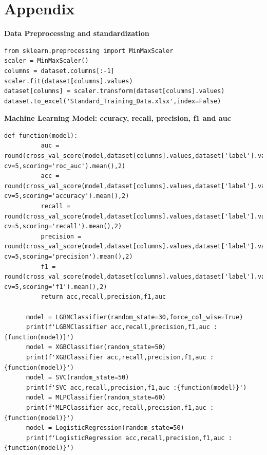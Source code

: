 \documentclass[12pt]{article}
\begin{document}
\section{Appendix}

\textbf{Data Preprocessing and standardization}
\begin{lstlisting}[caption={Data Preprocessing and standardization}, label=python-example]
from sklearn.preprocessing import MinMaxScaler
scaler = MinMaxScaler()
columns = dataset.columns[:-1]
scaler.fit(dataset[columns].values)
dataset[columns] = scaler.transform(dataset[columns].values)
dataset.to_excel('Standard_Training_Data.xlsx',index=False)
\end{lstlisting}

\textbf{Machine Learning Model: ccuracy, recall, precision, f1 and auc}
\begin{lstlisting}[caption={Machine Learning Model: ccuracy, recall, precision, f1 and auc}, label=python-example]
      def function(model):
          auc = round(cross_val_score(model,dataset[columns].values,dataset['label'].values, cv=5,scoring='roc_auc').mean(),2)
          acc = round(cross_val_score(model,dataset[columns].values,dataset['label'].values, cv=5,scoring='accuracy').mean(),2)
          recall = round(cross_val_score(model,dataset[columns].values,dataset['label'].values, cv=5,scoring='recall').mean(),2)
          precision = round(cross_val_score(model,dataset[columns].values,dataset['label'].values, cv=5,scoring='precision').mean(),2)
          f1 = round(cross_val_score(model,dataset[columns].values,dataset['label'].values, cv=5,scoring='f1').mean(),2)
          return acc,recall,precision,f1,auc

      model = LGBMClassifier(random_state=30,force_col_wise=True)
      print(f'LGBMClassifier acc,recall,precision,f1,auc :{function(model)}')
      model = XGBClassifier(random_state=50)
      print(f'XGBClassifier acc,recall,precision,f1,auc :{function(model)}')
      model = SVC(random_state=50)
      print(f'SVC acc,recall,precision,f1,auc :{function(model)}')
      model = MLPClassifier(random_state=60)
      print(f'MLPClassifier acc,recall,precision,f1,auc :{function(model)}')
      model = LogisticRegression(random_state=50)
      print(f'LogisticRegression acc,recall,precision,f1,auc :{function(model)}')
\end{lstlisting}
\end{document}
